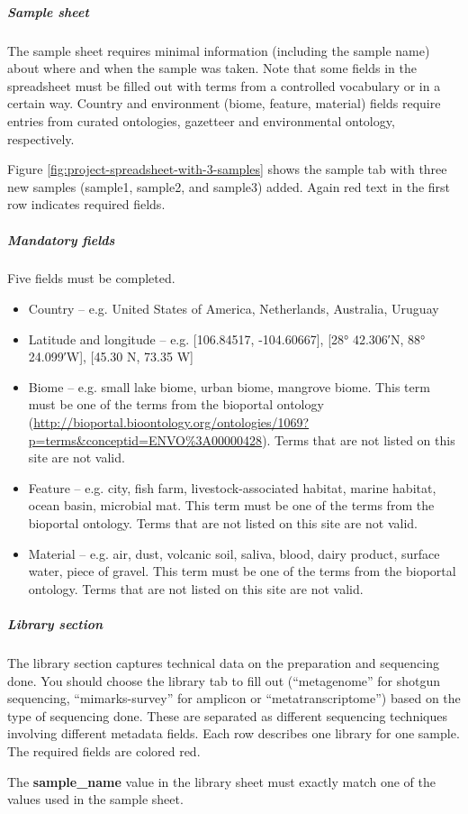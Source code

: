 \documentclass[12pt,fullpage]{report}
\begin{document}
\subparagraph*{Sample sheet}
The sample sheet requires minimal information (including the sample name) about where and when the sample was taken. Note that some fields in the spreadsheet must be filled out with terms from a controlled vocabulary or in a certain way. Country and environment (biome, feature, material) fields require entries from curated ontologies, gazetteer and environmental ontology, respectively.

Figure \ref{fig:project-spreadsheet-with-3-samples}
shows the sample tab with three new samples (sample1, sample2, and sample3) added. Again red text in the first row indicates required fields.

\subparagraph*{Mandatory fields}
Five fields must be completed.
\begin{itemize}
\item Country --
e.g. United States of America, Netherlands, Australia, Uruguay
\item Latitude and longitude -- 
e.g. [106.84517, -104.60667], [28° 42.306′N, 88° 24.099′W], [45.30 N, 73.35 W]
\item Biome --
e.g. small lake biome, urban biome, mangrove biome. This term must be one of the terms from the bioportal ontology (\url{http://bioportal.bioontology.org/ontologies/1069?p=terms&conceptid=ENVO\%3A00000428}). Terms that are not listed on this site are not valid.
\item Feature --
e.g. city, fish farm, livestock-associated habitat, marine habitat, ocean basin, microbial mat. This term must be one of the terms from the bioportal ontology. Terms that are not listed on this site are not valid.
\item Material --
e.g. air, dust, volcanic soil, saliva, blood, dairy product, surface water, piece of gravel. This term must be one of the terms from the bioportal ontology. Terms that are not listed on this site are not valid.
\end{itemize}

\subparagraph*{Library section}
The library section captures technical data on the preparation and sequencing done. You should choose the library tab to fill out (``metagenome'' for shotgun sequencing, ``mimarks-survey'' for amplicon or ``metatranscriptome'') based on the type of sequencing done. These are separated as different sequencing techniques involving different metadata fields. Each row describes one library for one sample. The required fields are colored red.

The \textbf{sample\_name} value in the library sheet must exactly match one of the values used in the sample sheet.
\end{document}
